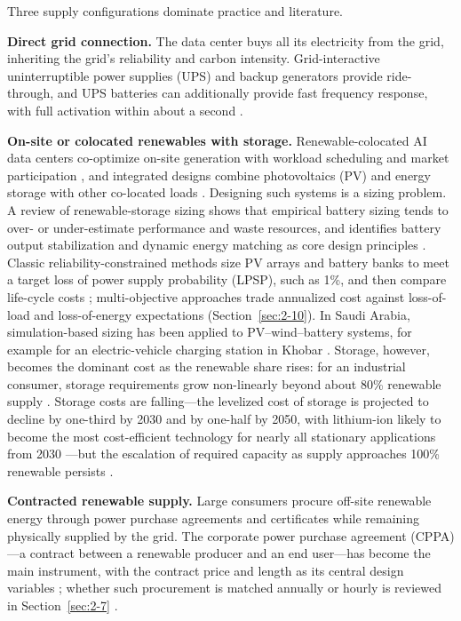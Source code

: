 Three supply configurations dominate practice and literature.

\textbf{Direct grid connection.} The data center buys all its electricity from the grid, inheriting the grid's reliability and carbon intensity. Grid-interactive uninterruptible power supplies (UPS) and backup generators provide ride-through, and UPS batteries can additionally provide fast frequency response, with full activation within about a second \cite{r7}.

\textbf{On-site or colocated renewables with storage.} Renewable-colocated AI data centers co-optimize on-site generation with workload scheduling and market participation \cite{r8}, and integrated designs combine photovoltaics (PV) and energy storage with other co-located loads \cite{r22}. Designing such systems is a sizing problem. A review of renewable-storage sizing shows that empirical battery sizing tends to over- or under-estimate performance and waste resources, and identifies battery output stabilization and dynamic energy matching as core design principles \cite{r30}. Classic reliability-constrained methods size PV arrays and battery banks to meet a target loss of power supply probability (LPSP), such as 1\%, and then compare life-cycle costs \cite{r31}; multi-objective approaches trade annualized cost against loss-of-load and loss-of-energy expectations \cite{r32} (Section~\ref{sec:2-10}). In Saudi Arabia, simulation-based sizing has been applied to PV--wind--battery systems, for example for an electric-vehicle charging station in Khobar \cite{r33}. Storage, however, becomes the dominant cost as the renewable share rises: for an industrial consumer, storage requirements grow non-linearly beyond about 80\% renewable supply \cite{r15}. Storage costs are falling---the levelized cost of storage is projected to decline by one-third by 2030 and by one-half by 2050, with lithium-ion likely to become the most cost-efficient technology for nearly all stationary applications from 2030 \cite{r43}---but the escalation of required capacity as supply approaches 100\% renewable persists \cite{r11,r15}.

\textbf{Contracted renewable supply.} Large consumers procure off-site renewable energy through power purchase agreements and certificates while remaining physically supplied by the grid. The corporate power purchase agreement (CPPA)---a contract between a renewable producer and an end user---has become the main instrument, with the contract price and length as its central design variables \cite{r42}; whether such procurement is matched annually or hourly is reviewed in Section~\ref{sec:2-7} \cite{r10,r11,r14,r15,r16}.

